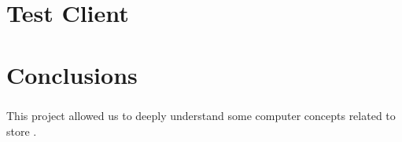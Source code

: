 \documentclass{report}
\begin{document}
	\chapter{Test Client}
	
	        \paragraph{}
	        
	        \paragraph{}

	\chapter{Conclusions}
	
	        \paragraph{}This project allowed us to deeply understand some computer concepts related to store .
	        
	        \paragraph{}
			
\end{document}
